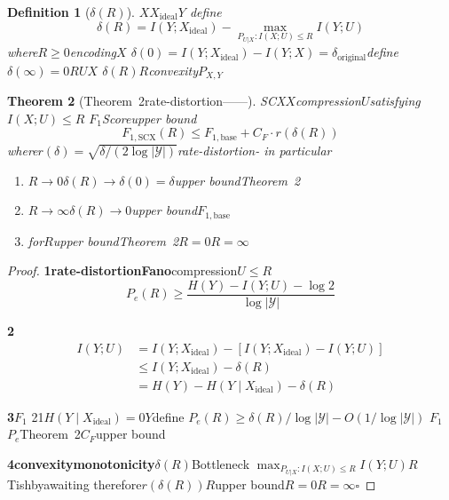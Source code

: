 \documentclass[11pt,a4paper]{article}
\newtheorem{theorem}{Theorem}[section]
\newtheorem{definition}[theorem]{Definition}
\theoremstyle{remark}
\newcommand{\Y}{\mathcal{Y}}
\begin{document}
\begin{definition}[$\delta(R)$]
\label{def:delta_r}
$X$$X_{\text{ideal}}$$Y$
define\textbf{}
\begin{equation}
    \boxed{\delta(R) = I(Y; X_{\text{ideal}}) - \max_{P_{U|X}: I(X;U) \leq R} I(Y; U)}
\end{equation}
where$R \geq 0$encoding$X$
$\delta(0) = I(Y; X_{\text{ideal}}) - I(Y; X) = \delta_{\text{original}}$define
$\delta(\infty) = 0$$R$$U$$X$
$\delta(R)$$R$convexity$P_{X,Y}$
\end{definition}

\begin{theorem}[Theorem~2rate-distortion——]
\label{thm:thm2_rdt}
SCX$X$compression$U$satisfying$I(X; U) \leq R$
$F_1$Scoreupper bound
\begin{equation}
    \boxed{F_{1,\text{SCX}}(R) \leq F_{1,\text{base}} + C_F \cdot r(\delta(R))}
\end{equation}
where$r(\delta) = \sqrt{\delta / (2 \log |\Y|)}$rate-distortion-
in particular
\begin{enumerate}[label=(\roman*)]
    \item $R \to 0$$\delta(R) \to \delta(0) = \delta$upper boundTheorem~2
    \item $R \to \infty$$\delta(R) \to 0$upper bound$F_{1,\text{base}}$
    \item for$R$upper boundTheorem~2$R=0$$R=\infty$
\end{enumerate}
\end{theorem}

\begin{proof}
\textbf{1rate-distortionFano}compression$U$$\leq R$
\begin{equation}
    P_e(R) \geq \frac{H(Y) - I(Y; U) - \log 2}{\log |\Y|}
\end{equation}

\textbf{2}
\begin{align}
    I(Y; U) &= I(Y; X_{\text{ideal}}) - [I(Y; X_{\text{ideal}}) - I(Y; U)] \\
            &\leq I(Y; X_{\text{ideal}}) - \delta(R) \\
            &= H(Y) - H(Y \mid X_{\text{ideal}}) - \delta(R)
\end{align}

\textbf{3$F_1$}
21$H(Y \mid X_{\text{ideal}}) = 0$$Y$define
$P_e(R) \geq \delta(R) / \log |\Y| - O(1/\log|\Y|)$
$F_1$$P_e$Theorem~2$C_F$upper bound

\textbf{4convexitymonotonicity}$\delta(R)$Bottleneck
$\max_{P_{U|X}: I(X;U) \leq R} I(Y; U)$$R$Tishbyawaiting\cite{tishby2000ib}
therefore$r(\delta(R))$$R$upper bound$R=0$$R=\infty$\hfill $\square$
\end{proof}
\end{document}
